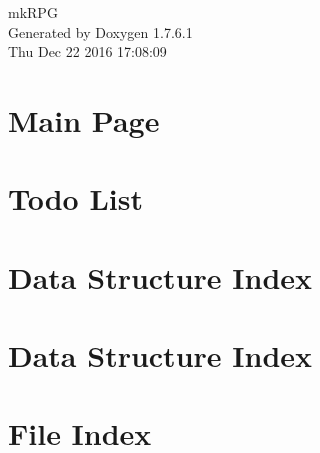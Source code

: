 \documentclass[a4paper]{book}
\begin{document}
\hypersetup{pageanchor=false,citecolor=blue}
\begin{titlepage}
\vspace*{7cm}
\begin{center}
{\Large mk\-R\-P\-G }\\
\vspace*{1cm}
{\large \-Generated by Doxygen 1.7.6.1}\\
\vspace*{0.5cm}
{\small Thu Dec 22 2016 17:08:09}\\
\end{center}
\end{titlepage}
\clearemptydoublepage
{}
\tableofcontents
\clearemptydoublepage
{}
\hypersetup{pageanchor=true,citecolor=blue}
\chapter{\-Main \-Page}
\label{index}\hypertarget{index}{}
\chapter{\-Todo \-List}
\label{todo}
\hypertarget{todo}{}

\chapter{\-Data \-Structure \-Index}

\chapter{\-Data \-Structure \-Index}

\chapter{\-File \-Index}

\end{document}

